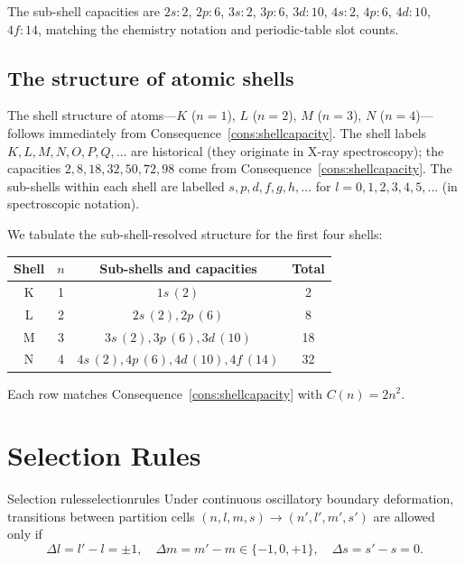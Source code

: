 \begin{example}
The sub-shell capacities are $2s:2$, $2p:6$, $3s:2$, $3p:6$, $3d:10$, $4s:2$, $4p:6$, $4d:10$, $4f:14$, matching the chemistry notation and periodic-table slot counts.
\end{example}

\subsection{The structure of atomic shells}

The shell structure of atoms---$K$ ($n=1$), $L$ ($n=2$), $M$ ($n=3$), $N$ ($n=4$)---follows immediately from Consequence~\ref{cons:shellcapacity}. The shell labels $K, L, M, N, O, P, Q, \ldots$ are historical (they originate in X-ray spectroscopy); the capacities $2, 8, 18, 32, 50, 72, 98$ come from Consequence~\ref{cons:shellcapacity}. The sub-shells within each shell are labelled $s, p, d, f, g, h, \ldots$ for $l=0, 1, 2, 3, 4, 5, \ldots$ (in spectroscopic notation).

We tabulate the sub-shell-resolved structure for the first four shells:
\begin{center}
\begin{tabular}{c|c|c|c}
\toprule
Shell & $n$ & Sub-shells and capacities & Total\\
\midrule
K & 1 & $1s\,(2)$                    & 2\\
L & 2 & $2s\,(2),2p\,(6)$             & 8\\
M & 3 & $3s\,(2),3p\,(6),3d\,(10)$   & 18\\
N & 4 & $4s\,(2),4p\,(6),4d\,(10),4f\,(14)$ & 32\\
\bottomrule
\end{tabular}
\end{center}
Each row matches Consequence~\ref{cons:shellcapacity} with $C(n)=2n^{2}$.

\section{Selection Rules}
\label{sec:selectionrules}

\begin{consequence}{Selection rules}{selectionrules}
Under continuous oscillatory boundary deformation, transitions between partition cells $(n,l,m,s)\to(n',l',m',s')$ are allowed only if
\begin{equation}
\Delta l=l'-l=\pm 1,\quad \Delta m=m'-m\in\{-1,0,+1\},\quad \Delta s=s'-s=0.
\label{eq:selectrules}
\end{equation}
\end{consequence}

